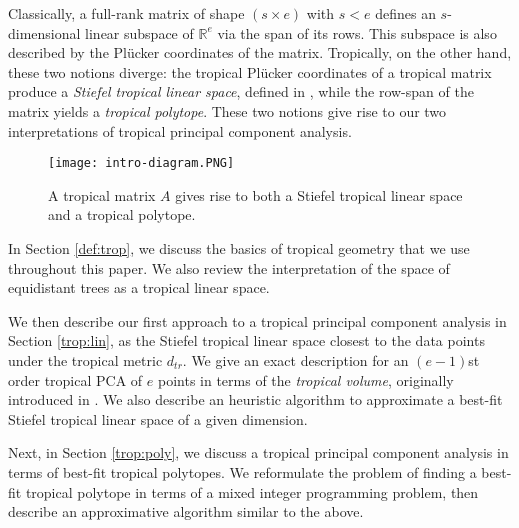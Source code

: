 \documentclass[12pt]{extarticle}
\numberwithin{theorem}{section}
\begin{document}
Classically, a full-rank matrix of shape $(s\times e)$ with $s<e$ defines an $s$-dimensional linear subspace of $\mathbb R^e$ via the span of its rows. This subspace is also described by the Pl\"ucker coordinates of the matrix. Tropically, on the other hand, these two notions diverge: the tropical Pl\"ucker coordinates of a tropical matrix produce a \emph{Stiefel tropical linear space}, defined in \cite{FR}, while the row-span of the matrix yields a \emph{tropical polytope}. These two notions give rise to our two interpretations of tropical principal component analysis.
\begin{figure}[!ht]
\centering
\texttt{[image: intro-diagram.PNG]}
\caption{A tropical matrix $A$ gives rise to both a Stiefel tropical linear space and a tropical polytope.}
\end{figure}

In Section \ref{def:trop}, we
discuss the basics of tropical geometry that we use throughout this paper. We also review the interpretation of the space of equidistant trees as a tropical linear space. 

We then describe our first approach to a tropical principal component analysis in Section \ref{trop:lin}, as the {Stiefel tropical linear space} closest to the data points under the tropical metric $d_{tr}$. We give an exact description for an $(e-1)$st order tropical PCA of $e$ points in terms of the \emph{tropical volume}, originally introduced in \cite{DGJ}. We also describe an heuristic algorithm to approximate a best-fit Stiefel tropical linear space of a given dimension.

Next, in Section \ref{trop:poly}, we discuss a tropical principal component analysis in terms of best-fit {tropical polytopes}. We reformulate the problem of finding a best-fit tropical polytope in terms of a mixed integer programming problem, then describe an approximative algorithm similar to the above.
\end{document}

